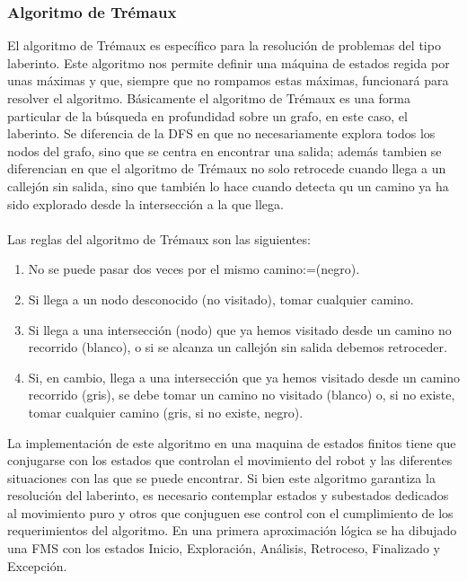 \documentclass[a4paper,9pt]{article}
\begin{document}
\subsubsection{Algoritmo de Trémaux}
El algoritmo de Trémaux es específico para la resolución de problemas del tipo laberinto. Este algoritmo nos permite definir una máquina de estados regida por unas máximas y que, siempre que no rompamos estas máximas, funcionará para resolver el algoritmo. Básicamente el algoritmo de Trémaux es una forma particular de la búsqueda en profundidad sobre un grafo, en este caso, el laberinto. Se diferencia de la DFS en que no necesariamente explora todos los nodos del grafo, sino que se centra en encontrar una salida; además tambien se diferencian en que el algoritmo de Trémaux no solo retrocede cuando llega a un callejón sin salida, sino que también lo hace cuando detecta qu un camino ya ha sido explorado desde la intersección a la que llega.
\paragraph{}
Las reglas del algoritmo de Trémaux son las siguientes:
\begin{enumerate}
    \item No se puede pasar dos veces por el mismo camino:=(negro).
    \item Si llega a un nodo desconocido (no visitado), tomar cualquier camino.
    \item Si llega a una intersección (nodo) que ya hemos visitado desde un camino no recorrido (blanco), o si se alcanza un callejón sin salida debemos retroceder.
    \item Si, en cambio, llega a una intersección que ya hemos visitado desde un camino recorrido (gris), se debe tomar un camino no visitado (blanco) o, si no existe, tomar cualquier camino (gris, si no existe, negro).
\end{enumerate}
La implementación de este algoritmo en una maquina de estados finitos tiene que conjugarse con los estados que controlan el movimiento del robot y las diferentes situaciones con las que se puede encontrar. Si bien este algoritmo garantiza la resolución del laberinto, es necesario contemplar estados y subestados dedicados al movimiento puro y otros que conjuguen ese control con el cumplimiento de los requerimientos del algoritmo. En una primera aproximación lógica se ha dibujado una FMS con los estados Inicio, Exploración, Análisis, Retroceso, Finalizado y Excepción.
\end{document}

